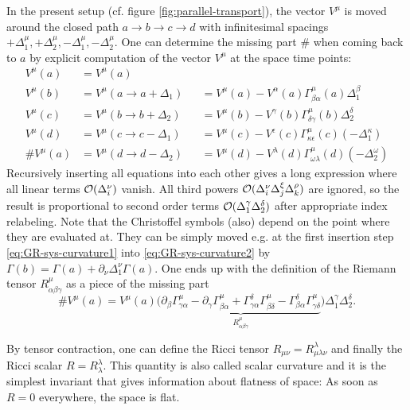 \documentclass[12pt,a4paper]{report}
\numberwithin{equation}{chapter}
\begin{document}
In the present setup (cf. figure \ref{fig:parallel-transport}), the vector $V^\mu$ is moved around the closed path $a\to b\to c\to d$ with infinitesimal spacings $+\Delta_1^\mu, +\Delta_2^\mu, -\Delta_1^\mu, -\Delta_2^\mu$. One can determine the missing part $\#$ when coming back to $a$ by explicit computation of the vector $V^\mu$ at the space time points:
\begin{subequations}\label{eq:GR-sys-curvature}
\begin{alignat}{3}
V^\mu(a) &= V^\mu(a) \\
\label{eq:GR-sys-curvature1}
V^\mu(b)
&= V^\mu(a \to a + \Delta_1)
&&= V^\mu(a) - V^\alpha(a) \Gamma^\mu_{\beta \alpha}(a) \Delta_1^\beta \\
\label{eq:GR-sys-curvature2}
V^\mu(c)
&= V^\mu(b \to b + \Delta_2)
&&= V^\mu(b) - V^\gamma(b) \Gamma^\mu_{\delta \gamma}(b) \Delta_2^\delta \\
V^\mu(d)
&= V^\mu(c \to c - \Delta_1)
&&= V^\mu(c) - V^\epsilon(c) \Gamma^\mu_{\kappa \epsilon}(c) (-\Delta_1^\kappa) \\
\# V^\mu(a)
&= V^\mu(d \to d - \Delta_2)
&&= V^\mu(d) - V^\lambda(d) \Gamma^\mu_{\omega \lambda}(d) (-\Delta_2^\omega)
\end{alignat}
\end{subequations}
Recursively inserting all equations into each other gives a long expression where all linear terms ${\cal O}(\Delta_i^\nu)$ vanish. All third powers ${\cal O}(\Delta_i^\nu \Delta_j^\xi \Delta_k^\rho)$ are ignored, so the result is proportional to second order terms ${\cal O}(\Delta^\gamma_1 \Delta^\delta_2)$ after appropriate index relabeling. Note that the Christoffel symbols (also) depend on the point where they are evaluated at. They can be simply moved e.g. at the first insertion step \ref{eq:GR-sys-curvature1} into \ref{eq:GR-sys-curvature2} by $\Gamma(b) = \Gamma(a) + \partial_\nu \Delta_1^\nu \Gamma(a)$. One ends up with the definition of the Riemann tensor $R^\mu_{\alpha\beta\gamma}$ as a piece of the missing part
\begin{equation}
\# V^\mu(a) =
V^\mu(a)
\Big( \underbrace{
\partial_\beta \Gamma^\mu_{\gamma\alpha}
- \partial_\gamma \Gamma^\mu_{\beta\alpha}
+ \Gamma^\delta_{\gamma\alpha} \Gamma^\mu_{\beta\delta}
- \Gamma^\delta_{\beta\alpha} \Gamma^\mu_{\gamma\delta}
}_{R^\mu_{\alpha\beta\gamma}} \Big)
\Delta_1^\gamma \Delta_2^\delta.
\end{equation}

By tensor contraction, one can define the Ricci tensor $R_{\mu\nu} = R^\lambda_{\mu\lambda\nu}$ and finally the Ricci scalar $R=R^\lambda_\lambda$. This quantity is also called scalar curvature and it is the simplest invariant that gives information about flatness of space: As soon as $R=0$ everywhere, the space is flat.
\end{document}
